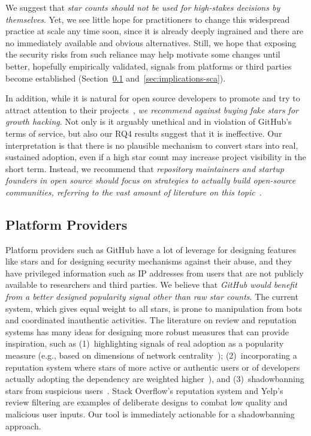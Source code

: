 We suggest that \emph{star counts should not be used for high-stakes decisions by themselves}.
Yet, we see little hope for practitioners to change this widespread practice at scale any time soon, since it is already deeply ingrained and there are no immediately available and obvious alternatives. 
Still, we hope that exposing the security risks from such reliance may help motivate some changes until better, hopefully empirically validated, signals from platforms or third parties become established (Section~\ref{sec:implication-platform} and~\ref{sec:implications-sca}).

In addition, while it is natural for open source developers to promote and try to attract attention to their projects~\cite{DBLP:conf/msr/FangKLHV20, DBLP:conf/icse/FangLHV22,bohnsack2019hack}, \emph{we recommend against buying fake stars for growth hacking}. 
Not only is it arguably unethical and in violation of GitHub's terms of service, but also our RQ4 results suggest that it is ineffective.
Our interpretation is that there is no plausible mechanism to convert stars into real, sustained adoption, even if a high star count may increase project visibility in the short term.  %
Instead, we recommend that \emph{repository maintainers and startup founders in open source should focus on strategies to actually build open-source communities, referring to the vast amount of literature on this topic}~\citep[e.g.,][]{kim2006community, product-approach}. %

\subsection{Platform Providers}
\label{sec:implication-platform}

Platform providers such as GitHub have a lot of leverage for designing features like stars and for designing security mechanisms against their abuse, and they have privileged information such as IP addresses from users that are not publicly available to researchers and third parties.
We believe that \emph{GitHub would benefit from a better designed popularity signal other than raw star counts}. 
The current system, which gives equal weight to all stars, is prone to manipulation from bots and coordinated inauthentic activities.
The literature on review and reputation systems has many ideas for designing more robust measures that can provide inspiration, such as (1)~highlighting signals of real adoption as a popularity measure (e.g., based on dimensions of network centrality~\cite{DBLP:journals/corr/abs-2405-07508}); (2)~incorporating a reputation system where stars of more active or authentic users or of developers actually adopting the dependency are weighted higher~\citep[e.g.,][]{DBLP:conf/asunam/Movshovitz-AttiasMSF13, dellarocas2010online}), and (3)~shadowbanning stars from suspicious users~\cite{risius2024shadowbanning, mukherjee2013yelp}.
Stack Overflow's reputation system and Yelp's review filtering are examples of deliberate designs to combat low quality and malicious user inputs.
Our \SystemName tool is immediately actionable for a shadowbanning approach.

